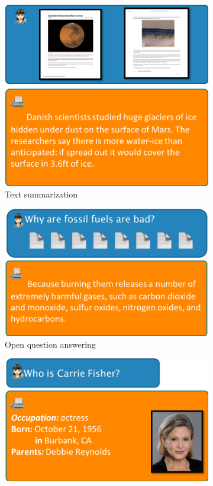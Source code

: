 \begin{figure}
  \centering
  \hfill
  \begin{subfigure}[b]{.32\textwidth}
    \includegraphics[width=\textwidth]{figures/task_ts}
    \caption{Text summarization}
  \end{subfigure}
  \hfill
  \begin{subfigure}[b]{.32\textwidth}
    \includegraphics[width=\textwidth]{figures/task_oqa}
    \caption{Open question answering}
  \end{subfigure}
  \hfill
  \begin{subfigure}[b]{.32\textwidth}
    \includegraphics[width=\textwidth]{figures/task_kbp}

\end{subfigure}
\end{figure}
